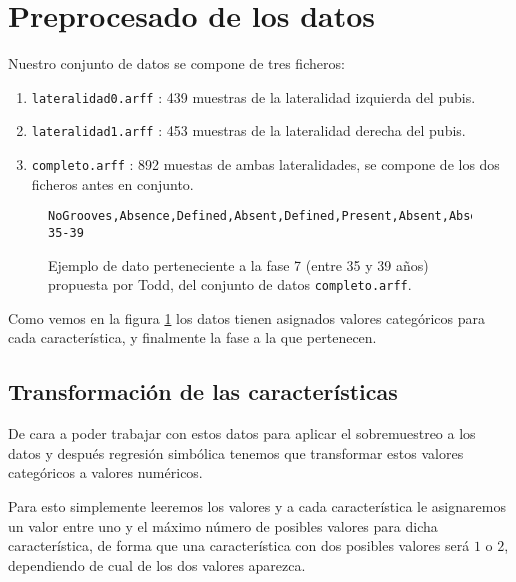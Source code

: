 \section{Preprocesado de los datos}

Nuestro conjunto de datos se compone de tres ficheros:

\begin{enumerate}
	\item \texttt{lateralidad0.arff} : 439 muestras de la lateralidad izquierda del pubis.
	\item \texttt{lateralidad1.arff} : 453 muestras de la lateralidad derecha del pubis.
	\item \texttt{completo.arff} : 892 muestas de ambas lateralidades, se compone de los dos ficheros antes en conjunto.
\end{enumerate}

\begin{figure}[H]
	\begin{lstlisting}[language={}]
	NoGrooves,Absence,Defined,Absent,Defined,Present,Absent,Absent,FormedWithoutRarefactions,Ph07-35-39
	\end{lstlisting}
	\caption{Ejemplo de dato perteneciente a la fase 7 (entre 35 y 39 años) propuesta por Todd, del conjunto de datos \texttt{completo.arff}.}
	\label{fig:ejemplo_dato}
\end{figure}

Como vemos en la figura \ref{fig:ejemplo_dato} los datos tienen asignados valores categóricos para cada característica, y finalmente la fase a la que pertenecen.

\subsection{Transformación de las características}

De cara a poder trabajar con estos datos para aplicar el sobremuestreo a los datos y después regresión simbólica tenemos que transformar estos valores categóricos a valores numéricos.

Para esto simplemente leeremos los valores y a cada característica le asignaremos un valor entre uno y el máximo número de posibles valores para dicha característica, de forma que una característica con dos posibles valores será $1$ o $2$, dependiendo de cual de los dos valores aparezca.


